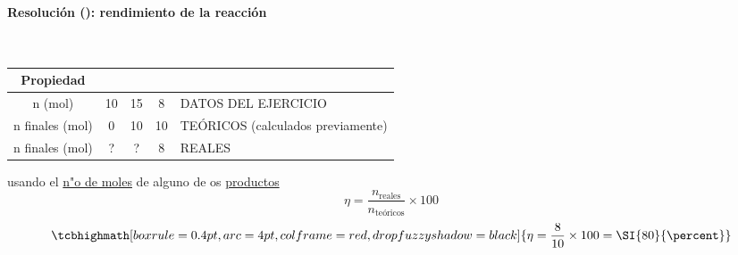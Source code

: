 \begin{frame}
	\frametitle{\ejerciciocmd}
	\framesubtitle{Resolución (): rendimiento de la reacción}
	 \\[.6cm]
	\begin{center}
		\begin{tabular}{cSSSl}
			\toprule
				Propiedad				&	{}	&	{}		&	{}	&										\\
			\midrule
				n (\si{\mol})			&	10				&	15					&	8				&	DATOS DEL EJERCICIO					\\
				n finales (\si{\mol})	&	0				&	10					&	10				&	TEÓRICOS (calculados previamente)	\\
				n finales (\si{\mol})	&	{?}				&	{?}					&	8				&	REALES								\\
			\bottomrule
		\end{tabular}
	\end{center}
	 usando el \underline{n"o de moles} de alguno de os \underline{productos}
	$$
		\eta = \frac{n_{\text{reales}}}{n_{\text{teóricos}}}\times 100
	$$
	$$
		\tcbhighmath[boxrule=0.4pt,arc=4pt,colframe=red,drop fuzzy shadow=black]{
			\eta = \frac{8}{10}\times 100 = \SI{80}{\percent}
																				}
	$$
\end{frame}

